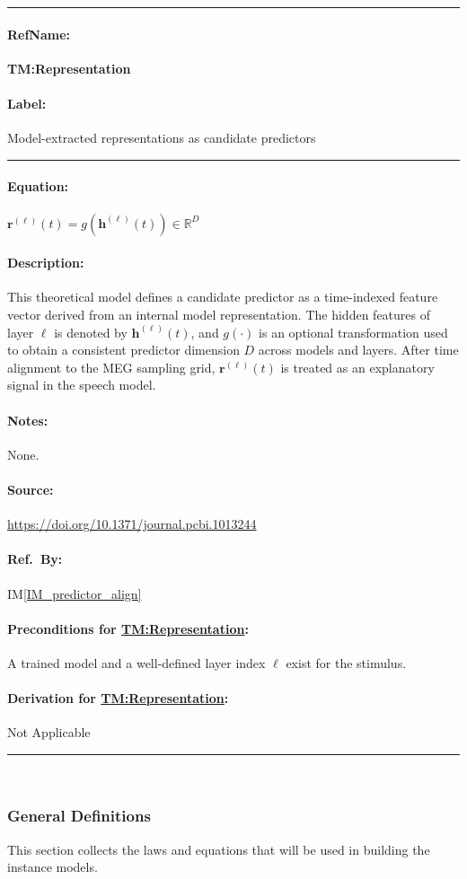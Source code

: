 \documentclass[12pt]{article}
\newcommand{\iref}[1]{IM\ref{#1}}
\newcommand{\deftheory}[9][Not Applicable]
{
\newpage
\noindent \rule{\textwidth}{0.5mm}

\paragraph{RefName: } \textbf{#2} \phantomsection 
\label{#2}

\paragraph{Label:} #3

\noindent \rule{\textwidth}{0.5mm}

\paragraph{Equation:}

#4

\paragraph{Description:}

#5

\paragraph{Notes:}

#6

\paragraph{Source:}

#7

\paragraph{Ref.\ By:}

#8

\paragraph{Preconditions for \hyperref[#2]{#2}:}
\label{#2_precond}

#9

\paragraph{Derivation for \hyperref[#2]{#2}:}
\label{#2_deriv}

#1

\noindent \rule{\textwidth}{0.5mm}

}
\begin{document}
\noindent
\deftheory
{TM:Representation}
{Model-extracted representations as candidate predictors}
{
  $
  \boldsymbol{r}^{(\ell)}(t) = g\!\left(\boldsymbol{h}^{(\ell)}(t)\right)
  \in \mathbb{R}^{D}
  $
}
{
  This theoretical model defines a candidate predictor as a time-indexed feature
  vector derived from an internal model representation.
  The hidden features of layer $\ell$ is denoted by
  $\boldsymbol{h}^{(\ell)}(t)$, and $g(\cdot)$ is an optional transformation
  used to obtain a consistent   predictor dimension $D$ across models and layers. After time alignment to the MEG sampling grid, $\boldsymbol{r}^{(\ell)}(t)$ is treated as an explanatory signal in the speech model.
}
{None.}
{
  \url{https://doi.org/10.1371/journal.pcbi.1013244}
}
{
  \iref{IM_predictor_align}
}
{
  A trained model and a well-defined layer index $\ell$ exist for the stimulus.
}
{}





















~\newline

\subsubsection{General Definitions}\label{sec_gendef}


This section collects the laws and equations that will be used in building the
instance models.


\end{document}
